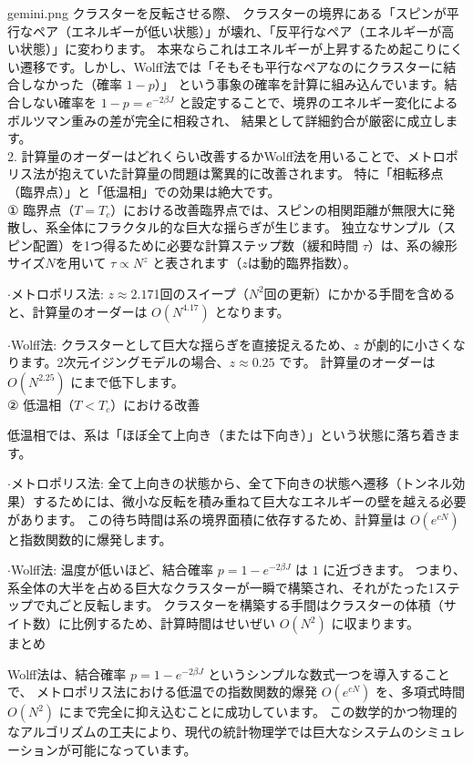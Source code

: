 \documentclass[a4paper,10.5pt]{jlreq}
\begin{document}
\begin{chatbox}{gemini.png}
  クラスターを反転させる際、
  クラスターの境界にある「スピンが平行なペア（エネルギーが低い状態）」が壊れ、「反平行なペア（エネルギーが高い状態）」に変わります。
  本来ならこれはエネルギーが上昇するため起こりにくい遷移です。しかし、Wolff法では「そもそも平行なペアなのにクラスターに結合しなかった（確率 $1-p$）」
  という事象の確率を計算に組み込んでいます。結合しない確率を $1-p = e^{-2\beta J}$ と設定することで、境界のエネルギー変化によるボルツマン重みの差が完全に相殺され、
  結果として詳細釣合が厳密に成立します。\\
  
  2. 計算量のオーダーはどれくらい改善するかWolff法を用いることで、メトロポリス法が抱えていた計算量の問題は驚異的に改善されます。
  特に「相転移点（臨界点）」と「低温相」での効果は絶大です。\\
  
  ① 臨界点（$T = T_c$）における改善臨界点では、スピンの相関距離が無限大に発散し、系全体にフラクタル的な巨大な揺らぎが生じます。
  独立なサンプル（スピン配置）を1つ得るために必要な計算ステップ数（緩和時間 $\tau$）は、系の線形サイズ$N$を用いて $\tau \propto N^z$ と表されます（$z$は動的臨界指数）。

  $\cdot$メトロポリス法: $z \approx 2.17$1回のスイープ（$N^2$回の更新）にかかる手間を含めると、計算量のオーダーは $O(N^{4.17})$ となります。
  
  $\cdot$Wolff法: クラスターとして巨大な揺らぎを直接捉えるため、$z$ が劇的に小さくなります。2次元イジングモデルの場合、$z \approx 0.25$ です。
  計算量のオーダーは $O(N^{2.25})$ にまで低下します。\\
  
  ② 低温相（$T < T_c$）における改善
  
  低温相では、系は「ほぼ全て上向き（または下向き）」という状態に落ち着きます。

  $\cdot$メトロポリス法: 全て上向きの状態から、全て下向きの状態へ遷移（トンネル効果）するためには、微小な反転を積み重ねて巨大なエネルギーの壁を越える必要があります。
  この待ち時間は系の境界面積に依存するため、計算量は $O(e^{c N})$ と指数関数的に爆発します。
  
  $\cdot$Wolff法: 温度が低いほど、結合確率 $p = 1 - e^{-2\beta J}$ は $1$ に近づきます。
  つまり、系全体の大半を占める巨大なクラスターが一瞬で構築され、それがたった1ステップで丸ごと反転します。
  クラスターを構築する手間はクラスターの体積（サイト数）に比例するため、計算時間はせいぜい $O(N^2)$ に収まります。\\
  
  まとめ
  
  Wolff法は、結合確率 $p = 1 - e^{-2\beta J}$ というシンプルな数式一つを導入することで、
  メトロポリス法における低温での指数関数的爆発 $O(e^{cN})$ を、多項式時間 $O(N^2)$ にまで完全に抑え込むことに成功しています。
  この数学的かつ物理的なアルゴリズムの工夫により、現代の統計物理学では巨大なシステムのシミュレーションが可能になっています。
\end{chatbox}
\end{document}
